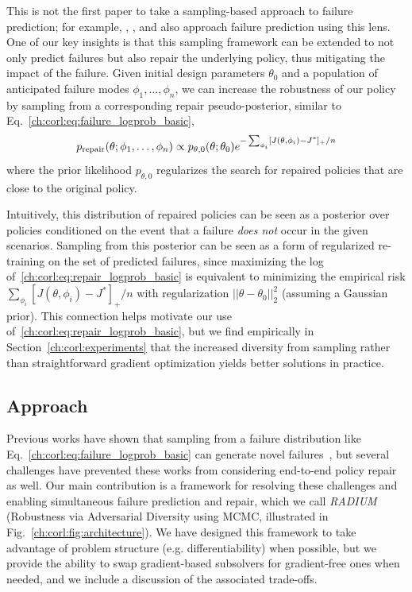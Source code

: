 This is not the first paper to take a sampling-based approach to failure prediction; for example, \cite{okellyScalableEndtoEndAutonomous2018}, \cite{sinhaNeuralBridgeSampling2020}, and \cite{zhouRoCUSRobotController2021} also approach failure prediction using this lens. One of our key insights is that this sampling framework can be extended to not only predict failures but also repair the underlying policy, thus mitigating the impact of the failure.
%
Given initial design parameters $\theta_0$ and a population of anticipated failure modes $\phi_1, \ldots, \phi_n$, we can increase the robustness of our policy by sampling from a corresponding repair pseudo-posterior, similar to Eq.~\eqref{ch:corl:eq:failure_logprob_basic},
%
\begin{equation}
    p_{\rm{repair}}(\theta; \phi_1, \ldots, \phi_n) \propto p_{\theta, 0}(\theta; \theta_0)e^{-\sum_{\phi_i}[J(\theta, \phi_i) - J^*]_+ / n} \label{ch:corl:eq:repair_logprob_basic}
\end{equation}
%
where the prior likelihood $p_{\theta, 0}$ regularizes the search for repaired policies that are close to the original policy.

Intuitively, this distribution of repaired policies can be seen as a posterior over policies conditioned on the event that a failure \textit{does not} occur in the given scenarios. Sampling from this posterior can be seen as a form of regularized re-training on the set of predicted failures, since maximizing the log of~\eqref{ch:corl:eq:repair_logprob_basic} is equivalent to minimizing the empirical risk $\sum_{\phi_i}[J(\theta, \phi_i) - J^*]_+ / n$ with regularization $||\theta-\theta_0||_2^2$ (assuming a Gaussian prior). This connection helps motivate our use of~\eqref{ch:corl:eq:repair_logprob_basic}, but we find empirically in Section~\ref{ch:corl:experiments} that the increased diversity from sampling rather than straightforward gradient optimization yields better solutions in practice.

\subsection{Approach}

Previous works have shown that sampling from a failure distribution like Eq.~\eqref{ch:corl:eq:failure_logprob_basic} can generate novel failures~\cite{zhouRoCUSRobotController2021,sinhaNeuralBridgeSampling2020,deleckiModelbasedValidationProbabilistic2023a}, but several challenges have prevented these works from considering end-to-end policy repair as well. Our main contribution is a framework for resolving these challenges and enabling simultaneous failure prediction and repair, which we call \textit{RADIUM} (Robustness via Adversarial Diversity using MCMC, illustrated in Fig.~\ref{ch:corl:fig:architecture}). We have designed this framework to take advantage of problem structure (e.g. differentiability) when possible, but we provide the ability to swap gradient-based subsolvers for gradient-free ones when needed, and we include a discussion of the associated trade-offs.

